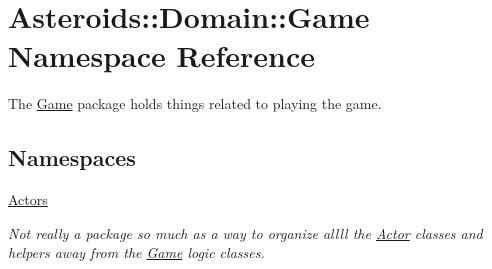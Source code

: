 \hypertarget{namespaceAsteroids_1_1Domain_1_1Game}{}\section{Asteroids\+:\+:Domain\+:\+:Game Namespace Reference}
\label{namespaceAsteroids_1_1Domain_1_1Game}


The \hyperlink{classAsteroids_1_1Domain_1_1Game_1_1Game}{Game} package holds things related to playing the game.  


\subsection*{Namespaces}
\begin{DoxyCompactItemize}
\item 
 \hyperlink{namespaceAsteroids_1_1Domain_1_1Game_1_1Actors}{Actors}
\begin{DoxyCompactList}\small\item\em Not really a package so much as a way to organize allll the \hyperlink{classAsteroids_1_1Domain_1_1Game_1_1Actors_1_1Actor}{Actor} classes and helpers away from the \hyperlink{classAsteroids_1_1Domain_1_1Game_1_1Game}{Game} logic classes. \end{DoxyCompactList}\end{DoxyCompactItemize}
